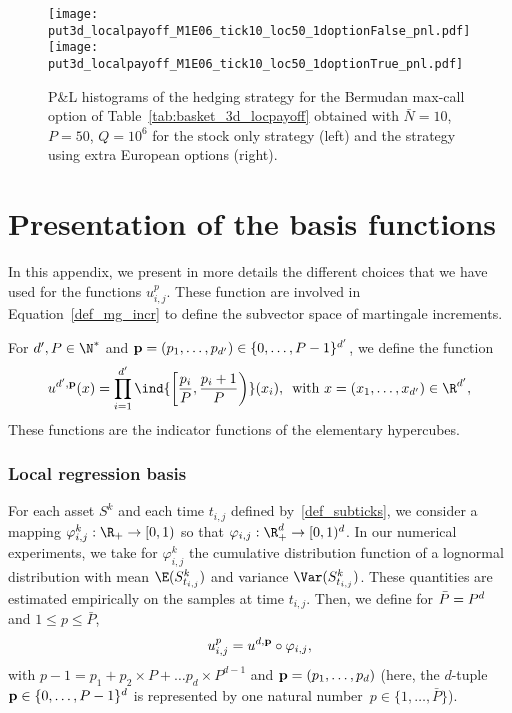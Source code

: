 \begin{figure}[h!]
  \texttt{[image: put3d\_localpayoff\_M1E06\_tick10\_loc50\_1doptionFalse\_pnl.pdf]}
  \texttt{[image: put3d\_localpayoff\_M1E06\_tick10\_loc50\_1doptionTrue\_pnl.pdf]}
  \caption{P\&L histograms of the hedging strategy for the Bermudan max-call option of Table~\ref{tab:basket_3d_locpayoff} obtained with $\bar{N}=10$, $P=50$, $Q=10^6$ for the stock only strategy (left) and the strategy using extra European options (right). }\label{fig:basket_3d_locpayoff}
\end{figure}



\appendix
\section{Presentation of the basis functions}\label{App_basis} 

In this appendix, we present in more details the different choices that we have used for the functions $u^p_{i,j}$. These function are involved in Equation~\eqref{def_mg_incr} to define the subvector space of martingale increments. 


For $d', P\in \N^*$ and ${\bf p}=(p_1,\dots,p_{d'})\in \{0,\dots, P-1\}^{d'}$, we define  the function 
\[
u^{d',\bf p}(x) = \prod_{i=1}^{d'} \ind{\left[\frac{p_i}{P}, \frac{p_i + 1}{P}\right)}(x_i), \, \text{ with } x=(x_1,\dots,x_{d'})\in \R^{d'},
\]
These functions are the indicator functions of the elementary hypercubes. 

\subsubsection*{Local regression basis}
For each asset $S^k$ and each time $t_{i,j}$ defined by~\eqref{def_subticks}, we consider a mapping  $\varphi^k_{i,j}:\R_+\to [0,1)$ so that $\varphi_{i,j}:\R_+^d\to [0,1)^d$. In our numerical experiments, we take for $\varphi^k_{i,j}$ the cumulative distribution function of a lognormal distribution with mean $\E(S^k_{t_{i,j}})$ and variance $\Var(S^k_{t_{i,j}})$. These quantities are estimated empirically on the samples at time $t_{i,j}$. Then, we define 
for $\Bar{P}=P^d$ and $1\le p\le \bar{P}$, 
\begin{equation}\label{def_upij_local} u^p_{i,j}=u^{d,{\bf p}} \circ \varphi_{i,j},\end{equation}
with $p-1=p_1+p_2\times P+\dots p_d \times P^{d-1}$ and ${\bf p}=(p_1,\dots,p_d)$ (here, the $d$-tuple ${\bf p}\in \{0,\dots,P-1 \}^{d}$ is represented by one natural number~$p\in \{1,\dots,\bar{P}\}$). 

